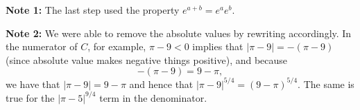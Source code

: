 \documentclass[12pt]{article}
\theoremstyle{definition}
\theoremstyle{underl}
\begin{document}
\begin{enumerate}[label=(\alph*), itemsep=0.125in, topsep=3mm, leftmargin=0.25in, rightmargin=0.25in]
			\textbf{Note 1:} The last step used the property $e^{a+b}=e^ae^b$.\vspace{3mm}
			
			\textbf{Note 2:} We were able to remove the absolute values by rewriting accordingly. In the numerator of $C$, for example, $\pi-9<0$ implies that $|\pi-9|=-(\pi-9)$ (since absolute value makes negative things positive), and because 
			$$-(\pi-9)=9-\pi,$$
			we have that $|\pi-9|=9-\pi$ and hence that $|\pi-9|^{5/4}=(9-\pi)^{5/4}$. The same is true for the $|\pi-5|^{9/4}$ term in the denominator.
		\end{enumerate}
\end{document}
